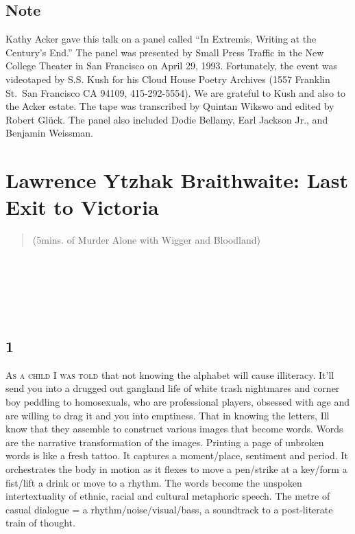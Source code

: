 \documentclass[
]{memoir}
\begin{document}
\hypertarget{note}{%
\section*{Note}\label{note}}

Kathy Acker gave this talk on a panel called ``In Extremis, Writing at
the Century's End.'' The panel was presented by Small Press Traffic in
the New College Theater in San Francisco on April 29, 1993. Fortunately,
the event was videotaped by S.S. Kush for his Cloud House Poetry
Archives (1557 Franklin St.~San Francisco CA 94109, 415-292-5554). We
are grateful to Kush and also to the Acker estate. The tape was
transcribed by Quintan Wikswo and edited by Robert Glück. The panel also
included Dodie Bellamy, Earl Jackson Jr., and Benjamin Weissman.

\hypertarget{lawrence-ytzhak-braithwaite-last-exit-to-victoria}{%
\chapter{Lawrence Ytzhak Braithwaite: Last Exit to
Victoria}\label{lawrence-ytzhak-braithwaite-last-exit-to-victoria}}

\begin{verse}
(5mins. of Murder Alone with Wigger and Bloodland)\\
\end{verse}

~

~

~

\hypertarget{section}{%
\section*{1}\label{section}}

\lettrine[lines=3, findent=0em, nindent=0.1em, lhang=0]{A}{s a child I was told}
that not knowing the alphabet will cause illiteracy. It'll send you into
a drugged out gangland life of white trash nightmares and corner boy
peddling to homosexuals, who are professional players, obsessed with age
and are willing to drag it and you into emptiness. That in knowing the
letters, Ill know that they assemble to construct various images that
become words. Words are the narrative transformation of the images.
Printing a page of unbroken words is like a fresh tattoo. It captures a
moment/place, sentiment and period. It orchestrates the body in motion
as it flexes to move a pen/strike at a key/form a fist/lift a drink or
move to a rhythm. The words become the unspoken intertextuality of
ethnic, racial and cultural metaphoric speech. The metre of casual
dialogue = a rhythm/noise/visual/bass, a soundtrack to a post-literate
train of thought.
\end{document}
